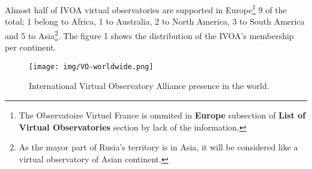Almost half of IVOA virtual observatories are supported in Europe\footnote{The
Observatoire Virtuel France is ommited in \textbf{Europe} subsection of
\textbf{List of Virtual Observatories} section by lack of the information.} 9 of
the total; 1 belong to Africa, 1 to Australia, 2 to North America, 3 to South
America and 5 to Asia\footnote{As the mayor part of Rusia's territory is in
Asia, it will be considered like a virtual observatory of Asian continent.}. The
figure 1 shows the distribution of the IVOA's membership per continent.\\


\begin{figure}%
\begin{center}
	\texttt{[image: img/VO-worldwide.png]}
	\caption{International Virtual Observatory Alliance presence in the world.}
\end{center}
\end{figure}













